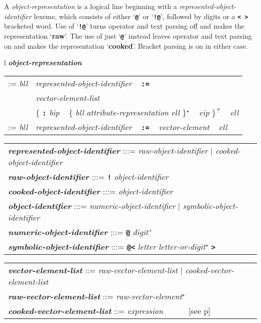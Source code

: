 \documentclass[12pt]{article}
\newcommand{\TT}[1]{{\tt \bfseries #1}}
\newcommand{\key}[1]{{\rm \bfseries #1}}
\newcommand{\ttkey}[1]{{\tt \bfseries #1}}
\newcommand{\emkey}[1]{{\em \bfseries #1}}
\newcommand{\pagref}[1]{p\pageref{#1}}
\newcommand{\STAR}{{\Large $^\star$}}
\newcommand{\PLUS}[1][]{{$^{+#1}$}}
\newcommand{\QMARK}{{$^{\,\mbox{\footnotesize ?}}$}}
\newenvironment{indpar}[1][0.3in]%
	{\begin{list}{}%
		     {\setlength{\itemsep}{0in}%
		      \setlength{\topsep}{0in}%
		      \setlength{\parsep}{1ex}%
		      \setlength{\labelwidth}{#1}%
		      \setlength{\leftmargin}{#1}%
		      \addtolength{\leftmargin}{\labelsep}}%
	 \item}%
	{\end{list}}
\begin{document}
A {\em object-representation} is a logical line beginning
with a {\em represented-object-identifier}
lexeme, which consists of either `\TT{@}'
or `\TT{!@}', followed by digits or a \TT{<~>} bracketed word.
Use of `\TT{!@}' turns operator and
text parsing off and makes the representation `\key{raw}'.  The use
of just `\TT{@}' instead leaves operator and text parsing on and makes the
representation `\key{cooked}'.  Bracket parsing is on in either case.

\begin{indpar}[0.5em]
\begin{tabular}{l}
\emkey{object-representation}\label{OBJECT-REPRESENTATION}
\\\hspace*{0.5in}
	\begin{tabular}[t]{rl}
        := {\em bll} & {\em represented-object-identifier} ~ \TT{:=} \\
		     & {\em vector-element-list} \\
	             & \{ \TT{:} {\em bip} ~
		          \{ {\em bll} {\em attribute-representation}
			     {\em ell} \}\STAR{} ~
			  {\em eip} \}\QMARK{} ~ {\em ell} \\
        := {\em bll} & {\em represented-object-identifier} ~ \TT{:=} ~
		       {\em vector-element} ~ {\em ell} \\
        \end{tabular}
\end{tabular}

\begin{tabular}{l}
\emkey{represented-object-identifier} :::=
    {\em raw-object-identifier} $|$ {\em cooked-object-identifier} \\
\emkey{raw-object-identifier} :::= \TT{!} {\em object-identifier} \\
\emkey{cooked-object-identifier} :::= {\em object-identifier} \\
\emkey{object-identifier} :::= {\em numeric-object-identifier}
                           $|$ {\em symbolic-object-identifier} \\
\emkey{numeric-object-identifier} :::=
	\ttkey{@}
	{\em digit}\PLUS{} \\
\emkey{symbolic-object-identifier} :::=
	\ttkey{@}\TT{<}
	{\em letter} {\em letter-or-digit}\STAR{} \TT{>} \\
\end{tabular}

\begin{tabular}{l}
\emkey{vector-element-list}\label{VECTOR-ELEMENT-LIST} ::=
	{\em raw-vector-element-list} $|$ {\em cooked-vector-element-list} \\
\emkey{raw-vector-element-list} ::= {\em raw-vector-element}\STAR{} \\
\emkey{cooked-vector-element-list} ::= {\em expression}
                                ~~~~~ [see \pagref{EXPRESSION}] \\
\end{tabular}


\end{indpar}
\end{document}
